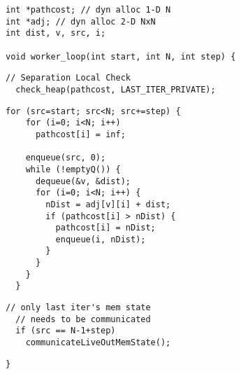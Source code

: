 \begin{lstlisting}[morekeywords={pathcost}, belowskip=0pt, firstnumber=1,
name=dij_checks]
int *pathcost; // dyn alloc 1-D N
int *adj; // dyn alloc 2-D NxN
int dist, v, src, i;

void worker_loop(int start, int N, int step) {
\end{lstlisting}

  \begin{lstlisting}[morekeywords={pathcost}, aboveskip=0pt,belowskip=0pt,backgroundcolor=\color{lightgray},
  firstnumber=auto, name=dij_checks]
  // Separation Local Check
  check_heap(pathcost, LAST_ITER_PRIVATE);
  \end{lstlisting}

\begin{lstlisting}[morekeywords={pathcost}, aboveskip=0pt, belowskip=0pt, firstnumber=auto,name=dij_checks]
  for (src=start; src<N; src+=step) {
    for (i=0; i<N; i++)
      pathcost[i] = inf;

    enqueue(src, 0);
    while (!emptyQ()) {
      dequeue(&v, &dist);
      for (i=0; i<N; i++) {
        nDist = adj[v][i] + dist;
        if (pathcost[i] > nDist) {
          pathcost[i] = nDist;
          enqueue(i, nDist);
        }
      }
    }
  }
    \end{lstlisting}

  \begin{lstlisting}[morekeywords={pathcost}, aboveskip=0pt,belowskip=0pt,backgroundcolor=\color{lightgray}, firstnumber=auto, name=dij_checks]
  // only last iter's mem state
  // needs to be communicated
  if (src == N-1+step)
    communicateLiveOutMemState();
\end{lstlisting}

\begin{lstlisting}[morekeywords={pathcost}, aboveskip=0pt, belowskip=0pt, firstnumber=auto,name=dij_checks]
}
\end{lstlisting}
